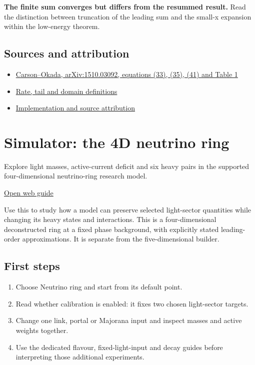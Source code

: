 \documentclass[11pt,a4paper]{article}
\begin{document}
\textbf{The finite sum converges but differs from the resummed result.} Read the distinction between truncation of the leading sum and the small-x expansion within the low-energy theorem.

\subsection*{Sources and attribution}
\begin{itemize}
\item \href{https://arxiv.org/abs/1510.03092}{Carson--Okada, arXiv:1510.03092, equations (33), (35), (41) and Table 1}
\item \href{https://github.com/karlesmarin/ghu-lab/blob/main/docs/diagnostics.md}{Rate, tail and domain definitions}
\item \href{https://github.com/karlesmarin/ghu-lab/blob/main/src/modules/higgs_diagnostics.mjs}{Implementation and source attribution}
\end{itemize}
\section{Simulator: the 4D neutrino ring}
Explore light masses, active-current deficit and six heavy pairs in the supported four-dimensional neutrino-ring research model.

\href{https://karlesmarin.github.io/ghu-explorer/guide/simulator-neutrino/index.html}{Open web guide}

Use this to study how a model can preserve selected light-sector quantities while changing its heavy states and interactions. This is a four-dimensional deconstructed ring at a fixed phase background, with explicitly stated leading-order approximations. It is separate from the five-dimensional builder.
\subsection*{First steps}
\begin{enumerate}
\item Choose Neutrino ring and start from its default point.
\item Read whether calibration is enabled: it fixes two chosen light-sector targets.
\item Change one link, portal or Majorana input and inspect masses and active weights together.
\item Use the dedicated flavour, fixed-light-input and decay guides before interpreting those additional experiments.
\end{enumerate}
\end{document}
